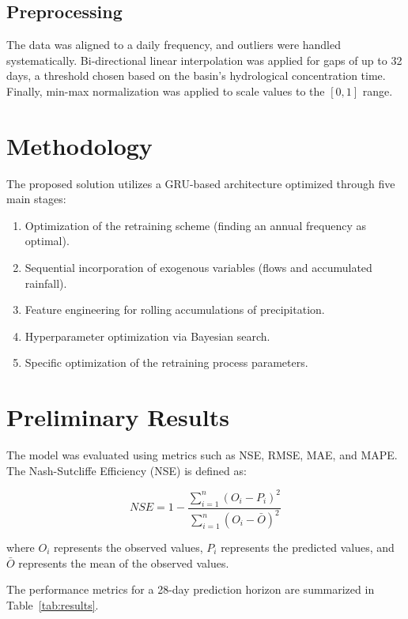 \documentclass[11pt, a4paper, oneside]{Thesis} %
\begin{document}
    \subsection{Preprocessing}
    The data was aligned to a daily frequency, and outliers were handled systematically. Bi-directional linear interpolation was applied for gaps of up to 32 days, a threshold chosen based on the basin's hydrological concentration time. Finally, min-max normalization was applied to scale values to the $[0,1]$ range.

    \section{Methodology}
    The proposed solution utilizes a GRU-based architecture optimized through five main stages:
    \begin{enumerate}
        \item Optimization of the retraining scheme (finding an annual frequency as optimal).
        \item Sequential incorporation of exogenous variables (flows and accumulated rainfall).
        \item Feature engineering for rolling accumulations of precipitation.
        \item Hyperparameter optimization via Bayesian search.
        \item Specific optimization of the retraining process parameters.
    \end{enumerate}

    \section{Preliminary Results}
    The model was evaluated using metrics such as NSE, RMSE, MAE, and MAPE. The Nash-Sutcliffe Efficiency (NSE) is defined as:
    
    \begin{equation}
    NSE = 1 - \frac{\sum_{i=1}^{n}(O_{i} - P_{i})^{2}}{\sum_{i=1}^{n}(O_{i} - \bar{O})^{2}}
    \end{equation}
    
    where $O_i$ represents the observed values, $P_i$ represents the predicted values, and $\bar{O}$ represents the mean of the observed values.

    The performance metrics for a 28-day prediction horizon are summarized in Table~\ref{tab:results}.
\end{document}
